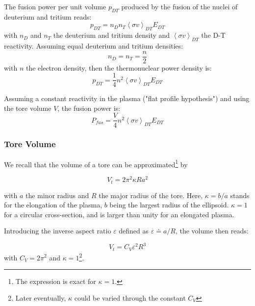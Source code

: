 The fusion power per unit volume $p_{DT}$ produced by the fusion of the nuclei of deuterium and tritium reads: 
\begin{equation*}
  p_{DT} = n_D n_T \left< \sigma v \right>_{DT} E_{DT}
\end{equation*}
with $n_D$ and $n_T$ the deuterium and tritium density and $\left< \sigma v \right>_{DT}$ the D-T reactivity. Assuming equal deuterium and tritium densities:
\begin{equation*}
  n_D = n_T = \frac{n}{2}
\end{equation*}
with $n$ the electron density, then the thermonuclear power density is:
\begin{equation*}
  p_{DT} = \frac{1}{4} n^2 \left< \sigma v \right>_{DT} E_{DT}
\end{equation*}

Assuming a constant reactivity in the plasma ("flat profile hypothesis") and using the tore volume $V$, the fusion power is: 
\begin{equation}
  P_{fus} = \frac{V}{4}
    n^2 \left< \sigma v \right>_{DT} E_{DT}
\end{equation}

\subsubsection{Tore Volume}

We recall that the volume of a tore can be approximated\footnote{The expression is exact for $\kappa=1$.} by 

\begin{equation}
    V_t = 2\pi^2 \kappa R a^2
\end{equation}

\noindent
with $a$ the minor radius and $R$ the major radius of the tore. Here, $\kappa=b/a$ stands for the elongation of the plasma, $b$ being the largest radius of the ellipsoid. $\kappa=1$ for a circular cross-section, and is larger than unity for an elongated plasma.

Introducing the inverse aspect ratio $\varepsilon$ defined as $\varepsilon  \doteq a /R$, the volume then reads:

\begin{equation}
    \boxed{
    	V_t = C_V \varepsilon^2 R^3
    }
    \label{eq:tore_volume}
\end{equation}
\noindent
with $C_V = 2\pi^2$ and $\kappa=1$\footnote{Later eventually, $\kappa$ could be varied through the constant $C_V$ }. 

